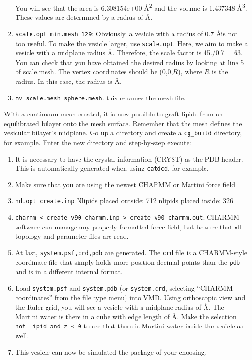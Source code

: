 \begin{enumerate}
   You will see that the area is 6.308154e+00 \AA\textsuperscript{2} and the volume is 1.437348 \AA\textsuperscript{3}.
   These values are determined by a radius of  \AA.
   \item \texttt{scale.opt min.mesh 129}: Obviously, a vesicle with a radius of 0.7 \AA is not too useful.
   To make the vesicle larger, use \texttt{scale.opt}.
   Here, we aim to make a vesicle with a midplane radius  \AA.
   Therefore, the scale factor is 45./0.7 = 63.
   You can check that you have obtained the desired radius by looking at line 5 of scale.mesh.
   The vertex coordinates should be (0,0,$R$), where $R$ is the radius.
   In this case, the radius is  \AA.
   \item \texttt{mv scale.mesh sphere.mesh}: this renames the mesh file.
\end{enumerate}

With a continuum mesh created, it is now possible to graft lipids from an equilibrated bilayer onto the mesh surface.
Remember that the mesh defines the vesicular bilayer's midplane.
Go up a directory and create a \texttt{cg_build} directory, for example.
Enter the new directory and step-by-step execute:
\begin{enumerate}
   \item It is necessary to have the crystal information (CRYST) as the PDB header.
   This is automatically generated when using \texttt{catdcd}, for example.
   \item Make sure that you are using the newest CHARMM or Martini force field.
   \item \texttt{hd.opt create.inp}
   Nlipids placed outside: 712 nlipids placed inside: 326
   \item \texttt{charmm < create_v90_charmm.inp > create_v90_charmm.out}: CHARMM software can manage any properly formatted force field, but be sure that all topology and parameter files are read.
   \item At last, \texttt{system.psf,crd,pdb} are generated.
   The \texttt{crd} file is a CHARMM-style coordinate file that simply holds more position decimal points than the \texttt{pdb} and is in a different internal format.
   \item Load \texttt{system.psf} and \texttt{system.pdb} (or \texttt{system.crd}, selecting ``CHARMM coordinates'' from the file type menu) into VMD.
   Using orthoscopic view and the Ruler grid, you will see a vesicle with a midplane radius of  \AA.
   The Martini water is there in a cube with edge length of  \AA.
   Make the selection \texttt{not lipid and z < 0} to see that there is Martini water inside the vesicle as well.
   \item This vesicle can now be simulated the package of your choosing.
\end{enumerate}


